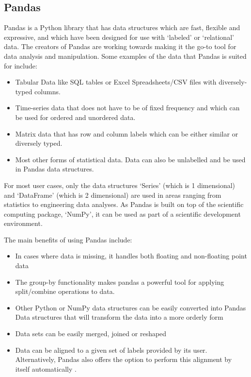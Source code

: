 \subsection{Pandas}
Pandas is a Python library that has data structures which are fast, flexible and expressive, and which have been designed for use with ‘labeled’ or ‘relational’ data. The creators of Pandas are working towards making it the go-to tool for data analysis and manipulation. Some examples of the data that Pandas is suited for include:
\begin{itemize}
	\item Tabular Data like SQL tables or Excel Spreadsheets/CSV files with diversely-typed columns.
	\item Time-series data that does not have to be of fixed frequency and which can be used for ordered and unordered data.
	\item Matrix data that has row and column labels which can be either similar or diversely typed.
	\item Most other forms of statistical data. Data can also be unlabelled and be used in Pandas data structures.
\end{itemize}
For most user cases, only the data structures ‘Series’ (which is 1 dimensional) and ‘DataFrame’ (which is 2 dimensional) are used in areas ranging from statistics to engineering data analyses. 
As Pandas is built on top of the scientific computing package, ‘NumPy’, it can be used as part of a scientific development environment.

The main benefits of using Pandas include:
\begin{itemize}
	\item In cases where data is missing, it handles both floating and non-floating point data
	\item The group-by functionality makes pandas a powerful tool for applying split/combine operations to data.
	\item Other Python or NumPy data structures can be easily converted into Pandas Data structures that will transform the data into a more orderly form
	\item Data sets can be easily merged, joined or reshaped
	\item Data can be aligned to a given set of labels provided by its user. Alternatively, Pandas also offers the option to perform this alignment by itself automatically \cite{pandas}.
\end{itemize}

